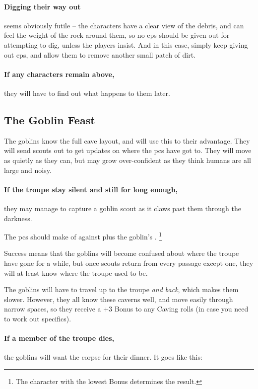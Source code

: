 \begin{multicols}{2}
\paragraph{Digging their way out}
seems obviously futile -- the characters have a clear view of the debris, and can feel the weight of the rock around them, so no \glspl{ep} should be given out for attempting to dig, unless the players insist.
And in this case, simply keep giving out \glspl{ep}, and allow them to remove another small patch of dirt.

\paragraph{If any characters remain above,}
they will have to find out what happens to them later.

\subsection{The Goblin Feast}

The goblins know the full cave layout, and will use this to their advantage.
They will send scouts out to get updates on where the \glspl{pc} have got to.
They will move as quietly as they can, but may grow over-confident as they think humans are all large and noisy.

\paragraph{If the troupe stay silent and still for long enough,}
they may manage to capture a goblin scout as it claws past them through the darkness.

The \glspl{pc} should make  of  against \tn[5] plus the goblin's .%
\footnote{The character with the lowest Bonus determines the result.}

Success means that the goblins will become confused about where the troupe have gone for a while, but once scouts return from every passage except one, they will at least know where the troupe used to be.

The goblins will have to travel up to the troupe \emph{and back}, which makes them slower.
However, they all know these caverns well, and move easily through narrow spaces, so they receive a +3 Bonus to any Caving rolls (in case you need to work out specifics).

\paragraph{If a member of the troupe dies,}
the goblins will want the corpse for their dinner.
It goes like this:


\end{multicols}
